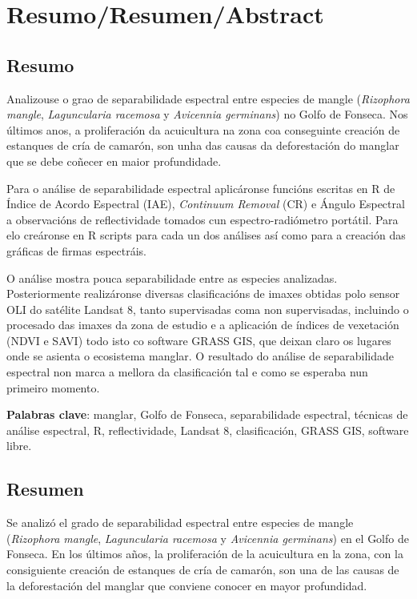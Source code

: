 
\chapter*{Resumo/Resumen/Abstract}
\section*{Resumo}
Analizouse o grao de separabilidade espectral entre especies de mangle (\textit{Rizophora mangle}, \textit{Laguncularia racemosa} y \textit{Avicennia germinans}) no Golfo de Fonseca. Nos últimos anos, a proliferación da acuicultura na zona coa conseguinte creación de estanques de cría de camarón, son unha das causas da deforestación do manglar que se debe coñecer en maior profundidade.

Para o análise de separabilidade espectral aplicáronse funcións escritas en R de Índice de Acordo Espectral (IAE), \textit{Continuum Removal} (CR) e Ángulo Espectral a observacións de reflectividade tomados cun espectro-radiómetro portátil. Para elo creáronse en R scripts para cada un dos análises así como para a creación das gráficas de firmas espectráis.

O análise mostra pouca separabilidade entre as especies analizadas. Posteriormente realizáronse diversas clasificacións de imaxes obtidas polo sensor OLI do satélite Landsat 8, tanto supervisadas coma non supervisadas, incluindo o procesado das imaxes da zona de estudio e a aplicación de índices de vexetación (NDVI e SAVI) todo isto co software GRASS GIS, que deixan claro os lugares onde se asienta o ecosistema manglar. O resultado do análise de separabilidade espectral non marca a mellora da clasificación tal e como se esperaba nun primeiro momento.

\noindent\textbf{Palabras clave}: manglar, Golfo de Fonseca, separabilidade espectral, técnicas de análise espectral, R, reflectividade, Landsat 8, clasificación, GRASS GIS, software libre.

\section*{Resumen}
Se analizó el grado de separabilidad espectral entre especies de mangle (\textit{Rizophora mangle}, \textit{Laguncularia racemosa} y \textit{Avicennia germinans}) en el Golfo de Fonseca. En los últimos años, la proliferación de la acuicultura en la zona, con la consiguiente creación de estanques de cría de camarón, son una de las causas de la deforestación del manglar que conviene conocer en mayor profundidad.

